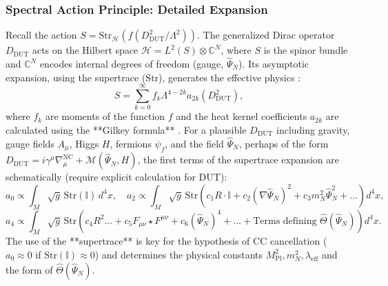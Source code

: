 \documentclass[11pt, a4paper]{article}
\theoremstyle{remark}
\newcommand{\Op}[1]{\hat{#1}}
\newcommand{\Str}{\mathrm{Str}}
\begin{document}
\subsubsection{Spectral Action Principle: Detailed Expansion}
\label{ssubsec:spectral_action_details_final}

Recall the action \( S = \Str_{\mathcal{H}}(f(D_{\text{DUT}}^2/\Lambda^2)) \). The generalized Dirac operator \( D_{\text{DUT}} \) acts on the Hilbert space \( \mathcal{H} = L^2(S) \otimes \mathbb{C}^N \), where \( S \) is the spinor bundle and \( \mathbb{C}^N \) encodes internal degrees of freedom (gauge, \( \Op{\Psi}_N \)). Its asymptotic expansion, using the supertrace (\(\Str\)), generates the effective physics \citep{ChamseddineConnes1997}:
\[
S = \sum_{k=0}^\infty f_k \Lambda^{4-2k} a_{2k}(D_{\text{DUT}}^2),
\]
where \( f_k \) are moments of the function \( f \) and the heat kernel coefficients \( a_{2k} \) are calculated using the **Gilkey formula** \citep{Gilkey1995}. For a plausible \( D_{\text{DUT}} \) including gravity, gauge fields \( A_\mu \), Higgs \( H \), fermions \( \psi_f \), and the field \( \Op{\Psi}_N \), perhaps of the form \( D_{\text{DUT}} = i\gamma^\mu \nabla_\mu^{\text{NC}} + \mathcal{M}(\Op{\Psi}_N, H) \), the first terms of the supertrace expansion are schematically (require explicit calculation for DUT):
\[
a_0 \propto \int_M \sqrt{g} \, \Str(\mathbb{I}) \, d^4x, \quad
a_2 \propto \int_M \sqrt{g} \, \Str \left( c_1 R \cdot \mathbb{I} + c_2 (\nabla \Op{\Psi}_N)^2 + c_3 m_N^2 \Op{\Psi}_N^2 + \dots \right) d^4x,
\]
\[
a_4 \propto \int_M \sqrt{g} \, \Str \left( c_4 R^2 \dots + c_5 F_{\mu\nu} \star F^{\mu\nu} + c_6 (\Op{\Psi}_N)^4 + \dots + \text{Terms defining } \Op{\Theta}(\Op{\Psi}_N) \right) d^4x.
\]
The use of the **supertrace** is key for the hypothesis of CC cancellation (\( a_0 \approx 0 \) if \( \Str(\mathbb{I}) \approx 0 \)) and determines the physical constants \( M_{\text{Pl}}^2, m_N^2, \lambda_{\text{eff}} \) and the form of \( \Op{\Theta}(\Op{\Psi}_N) \).
\end{document}
